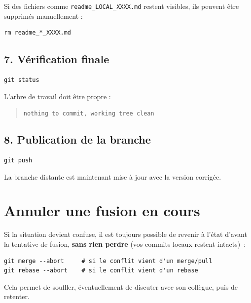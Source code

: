 \documentclass[11pt,a4paper]{article}
\begin{document}
Si des fichiers comme \texttt{readme\_LOCAL\_XXXX.md} restent visibles,
ils peuvent être supprimés manuellement :

\begin{lstlisting}[style=bashstyle]
rm readme_*_XXXX.md
\end{lstlisting}

\subsection*{7. Vérification finale}

\begin{lstlisting}[style=bashstyle]
git status
\end{lstlisting}

L’arbre de travail doit être propre :

\begin{quote}
	\texttt{nothing to commit, working tree clean}
\end{quote}

\subsection*{8. Publication de la branche}

\begin{lstlisting}[style=bashstyle]
git push
\end{lstlisting}

La branche distante est maintenant mise à jour avec la version corrigée.

\section{Annuler une fusion en cours}

Si la situation devient confuse, il est toujours possible de revenir à l'état d'avant la tentative de fusion, \textbf{sans rien perdre} (vos commits locaux restent intacts)~:

\begin{lstlisting}[style=bashstyle]
git merge --abort     # si le conflit vient d'un merge/pull
git rebase --abort    # si le conflit vient d'un rebase
\end{lstlisting}

Cela permet de souffler, éventuellement de discuter avec son collègue, puis de retenter.

\end{document}
